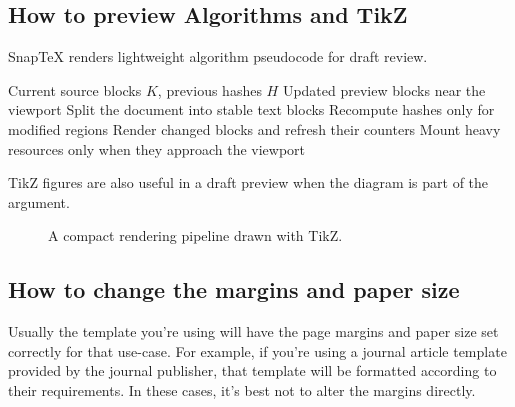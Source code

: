 \documentclass{article}
\begin{document}
\subsection{How to preview Algorithms and TikZ}

SnapTeX renders lightweight algorithm pseudocode for draft review.

\begin{algorithm}
\caption{Incremental SnapTeX update}
\label{alg:snap-update}
\begin{algorithmic}[1]
\Require Current source blocks $K$, previous hashes $H$
\Ensure Updated preview blocks near the viewport
\State Split the document into stable text blocks
\State Recompute hashes only for modified regions
\State Render changed blocks and refresh their counters
\State Mount heavy resources only when they approach the viewport
\end{algorithmic}
\end{algorithm}

TikZ figures are also useful in a draft preview when the diagram is part of the argument.

\begin{figure}
\centering
{}
\caption{A compact rendering pipeline drawn with TikZ.}
\label{fig:tikz-pipeline}
\end{figure}


\subsection{How to change the margins and paper size}

Usually the template you're using will have the page margins and paper size set correctly for that use-case. For example, if you're using a journal article template provided by the journal publisher, that template will be formatted according to their requirements. In these cases, it's best not to alter the margins directly.
\end{document}
